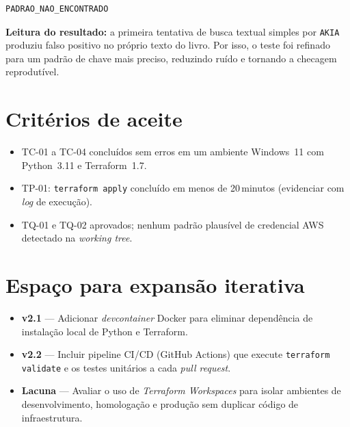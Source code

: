 \begin{lstlisting}[language=bash,
      caption={TQ-02 --- busca por padr\~ao de chave AWS na \textit{working tree}.},
      label={lst:cap2_akia_output}]
PADRAO_NAO_ENCONTRADO
\end{lstlisting}

\noindent\textbf{Leitura do resultado:} a primeira tentativa de busca
textual simples por \texttt{AKIA} produziu falso positivo no pr\'oprio
texto do livro. Por isso, o teste foi refinado para um padr\~ao de chave
mais preciso, reduzindo ru\'ido e tornando a checagem reprodut\'ivel.

\section{Crit\'erios de aceite}

\begin{itemize}[leftmargin=*]
  \item TC-01 a TC-04 conclu\'idos sem erros em um ambiente
        Windows~11 com Python~3.11 e Terraform~1.7.
  \item TP-01: \texttt{terraform apply} conclu\'ido em menos de
        20\,minutos (evidenciar com \textit{log} de execu\c{c}\~ao).
  \item TQ-01 e TQ-02 aprovados; nenhum padr\~ao plaus\'ivel de
        credencial AWS detectado na \textit{working tree}.
\end{itemize}

\section{Espa\c{c}o para expans\~ao iterativa}

\begin{itemize}[leftmargin=*]
  \item \textbf{v2.1} --- Adicionar \textit{devcontainer} Docker para
        eliminar depend\^encia de instala\c{c}\~ao local de Python e
        Terraform.
  \item \textbf{v2.2} --- Incluir pipeline CI/CD (GitHub Actions) que
        execute \texttt{terraform validate} e os testes unit\'arios a
        cada \textit{pull request}.
  \item \textbf{Lacuna} --- Avaliar o uso de \textit{Terraform Workspaces}
        para isolar ambientes de desenvolvimento, homologa\c{c}\~ao e
        produ\c{c}\~ao sem duplicar c\'odigo de infraestrutura.
\end{itemize}
